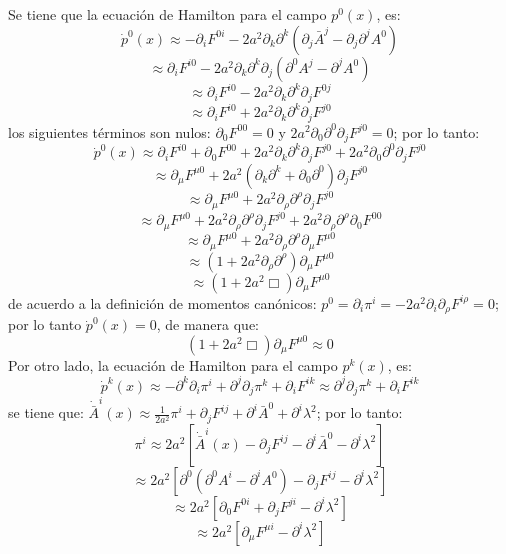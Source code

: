 \documentclass[a4paper,12pt]{article}
\begin{document}
Se tiene que la ecuación de Hamilton para el campo $p^{0}(x)$, es:
\begin{equation}
\dot p^{0}(x)\approx-\partial_iF^{0i}-2a^2\partial_k\partial^k(\partial_j\bar{A}^j-\partial_j\partial^jA^0) 
\end{equation}
$$\approx\partial_iF^{i0}-2a^2\partial_k\partial^k\partial_j(\partial^0A^j-\partial^jA^0)$$
$$\approx\partial_iF^{i0}-2a^2\partial_k\partial^k\partial_jF^{0j}$$
$$\approx\partial_iF^{i0}+2a^2\partial_k\partial^k\partial_jF^{j0}$$
los siguientes términos son nulos: $\partial_0F^{00}=0$ y $2a^2\partial_0\partial^0\partial_jF^{j0}=0$; por lo tanto:
\begin{equation}
\dot p^{0}(x)\approx\partial_iF^{i0}+\partial_0F^{00}+2a^2\partial_k\partial^k\partial_jF^{j0}+2a^2\partial_0\partial^0\partial_jF^{j0}
\end{equation}
$$\approx\partial_\mu F^{\mu0}+2a^2(\partial_k\partial^k+\partial_0\partial^0)\partial_jF^{j0}$$
$$\approx\partial_\mu F^{\mu0}+2a^2\partial_\rho\partial^\rho\partial_jF^{j0}$$
$$\approx\partial_\mu F^{\mu0}+2a^2\partial_\rho\partial^\rho\partial_jF^{j0}+2a^2\partial_\rho\partial^\rho\partial_0F^{00}$$
$$\approx\partial_\mu F^{\mu0}+2a^2\partial_\rho\partial^\rho\partial_\mu F^{\mu0}$$
$$\approx(1+2a^2\partial_\rho\partial^\rho)\partial_\mu F^{\mu0}$$
$$\approx(1+2a^2\Box)\partial_\mu F^{\mu0}$$
de acuerdo a la definición de momentos canónicos: \mbox{$p^0=\partial_i \pi^i=-2a^2\partial_i\partial_\rho F^{i\rho}=0$}; por lo tanto $\dot p^{0}(x)=0$, de manera que:
\begin{equation}
(1+2a^2\Box)\partial_\mu F^{\mu0}\approx0
\label{pa0}
\end{equation}
Por otro lado, la ecuación de Hamilton para el campo $p^{k}(x)$, es:
\begin{equation}
\dot p^{k}(x)\approx-\partial^k\partial_i\pi^{i}+\partial^j\partial_j\pi^{k}+\partial_iF^{ik}\approx\partial^j\partial_j\pi^{k}+\partial_iF^{ik}
\label{sust}
\end{equation}
se tiene que: $\dot{\bar{ A}}^i(x)\approx\frac{1}{2a^2}\pi^i+\partial_jF^{ij}+\partial^i\bar{ A}^0+\partial^i\lambda^2$; por lo tanto:
\begin{equation}
\pi^i\approx2a^2[\dot{\bar{ A}}^i(x)-\partial_jF^{ij}-\partial^i\bar{ A}^0-\partial^i\lambda^2]
\end{equation}
$$\approx2a^2[\partial^0(\partial^0A^i-\partial^iA^0)-\partial_jF^{ij}-\partial^i\lambda^2]$$
$$\approx2a^2[\partial_0F^{0i}+\partial_jF^{ji}-\partial^i\lambda^2]$$
$$\approx2a^2[\partial_\mu F^{\mu i}-\partial^i\lambda^2]$$
\end{document}
